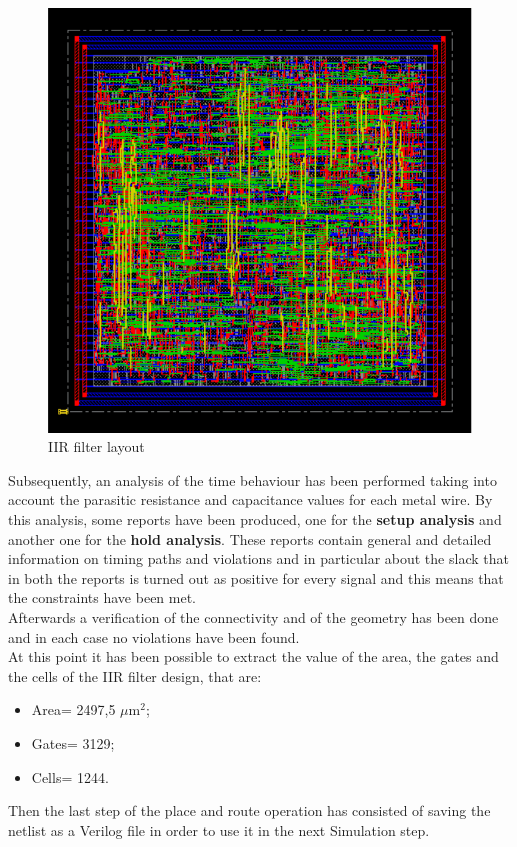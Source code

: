\documentclass[a4paper, titlepage]{article}
\begin{document}
 \begin{figure} [h]
\centering
	\includegraphics[scale=0.6]{filter_layout.png}
	\caption{IIR filter layout}
	\label{fig:filter_layout}
\end{figure}
\noindent
\newline
Subsequently, an analysis of the time behaviour has been performed taking into account the parasitic resistance and capacitance values for each metal wire.
By this analysis, some reports have been produced, one for the \textbf{setup analysis} and another one for the \textbf{hold analysis}. These reports contain general and detailed information on timing paths and violations and in particular about the slack that in both the reports is turned out as positive for every signal and this means that the constraints have been met.\\Afterwards a verification of the connectivity and of the geometry has been done and in each case no violations have been found.\\ At this point it has been possible to extract the value of the area, the gates and the cells of the IIR filter design, that are:
\begin{itemize}
    \item Area= 2497,5 $\mu$m$^2$;
    \item Gates= 3129;
    \item Cells= 1244.
\end{itemize}
Then the last step of the place and route operation has consisted of saving the netlist as a Verilog file in order to use it in the next Simulation step.
\end{document}
